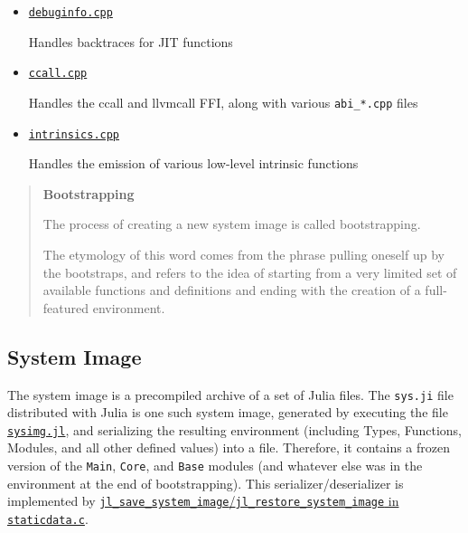 \begin{itemize}
\item \href{https://github.com/JuliaLang/julia/blob/master/src/debuginfo.cpp}{\texttt{debuginfo.cpp}}

Handles backtraces for JIT functions


\item \href{https://github.com/JuliaLang/julia/blob/master/src/ccall.cpp}{\texttt{ccall.cpp}}

Handles the ccall and llvmcall FFI, along with various \texttt{abi\_*.cpp} files


\item \href{https://github.com/JuliaLang/julia/blob/master/src/intrinsics.cpp}{\texttt{intrinsics.cpp}}

Handles the emission of various low-level intrinsic functions

\end{itemize}


\begin{quote}
\textbf{Bootstrapping}

The process of creating a new system image is called {\textquotedbl}bootstrapping{\textquotedbl}.

The etymology of this word comes from the phrase {\textquotedbl}pulling oneself up by the bootstraps{\textquotedbl}, and refers to the idea of starting from a very limited set of available functions and definitions and ending with the creation of a full-featured environment.

\end{quote}


\hypertarget{9959120445934014648}{}


\subsection{System Image}



The system image is a precompiled archive of a set of Julia files. The \texttt{sys.ji} file distributed with Julia is one such system image, generated by executing the file \href{https://github.com/JuliaLang/julia/blob/master/base/sysimg.jl}{\texttt{sysimg.jl}}, and serializing the resulting environment (including Types, Functions, Modules, and all other defined values) into a file. Therefore, it contains a frozen version of the \texttt{Main}, \texttt{Core}, and \texttt{Base} modules (and whatever else was in the environment at the end of bootstrapping). This serializer/deserializer is implemented by \href{https://github.com/JuliaLang/julia/blob/master/src/staticdata.c}{\texttt{jl\_save\_system\_image}/\texttt{jl\_restore\_system\_image} in \texttt{staticdata.c}}.



